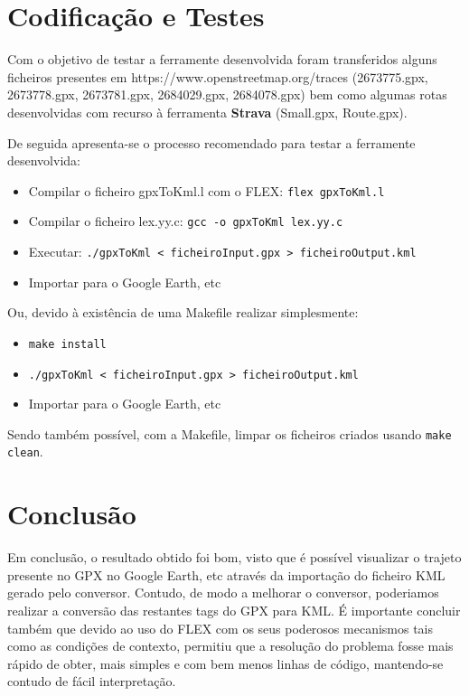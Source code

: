 \documentclass{llncs}
\begin{document}
\section{Codificação e Testes}
Com o objetivo de testar a ferramente desenvolvida foram transferidos alguns ficheiros presentes em https://www.openstreetmap.org/traces (2673775.gpx, 2673778.gpx, 2673781.gpx, 2684029.gpx, 2684078.gpx) bem como algumas rotas desenvolvidas com recurso à ferramenta \textbf{Strava} (Small.gpx, Route.gpx).

De seguida apresenta-se o processo recomendado para testar a ferramente desenvolvida:
\begin{itemize}
    \item Compilar o ficheiro gpxToKml.l com o FLEX: \verb|flex gpxToKml.l|
    \item Compilar o ficheiro lex.yy.c: \verb|gcc -o gpxToKml lex.yy.c|
    \item Executar: \verb|./gpxToKml < ficheiroInput.gpx > ficheiroOutput.kml|
    \item Importar para o Google Earth, etc
\end{itemize}

Ou, devido à existência de uma Makefile realizar simplesmente:
\begin{itemize}
    \item \verb|make install|
    \item \verb|./gpxToKml < ficheiroInput.gpx > ficheiroOutput.kml|
    \item Importar para o Google Earth, etc
\end{itemize}

Sendo também possível, com a Makefile, limpar os ficheiros criados usando \verb|make clean|.

\section{Conclusão}
Em conclusão, o resultado obtido foi bom, visto que é possível visualizar o trajeto presente no GPX no Google Earth, etc através da importação do ficheiro KML gerado pelo conversor. Contudo, de modo a melhorar o conversor, poderiamos realizar a conversão das restantes tags do GPX para KML. É importante concluir também que devido ao uso do FLEX com os seus poderosos mecanismos tais como as condições de contexto, permitiu que a resolução do problema fosse mais rápido de obter, mais simples e com bem menos linhas de código, mantendo-se contudo de fácil interpretação.
\end{document}
